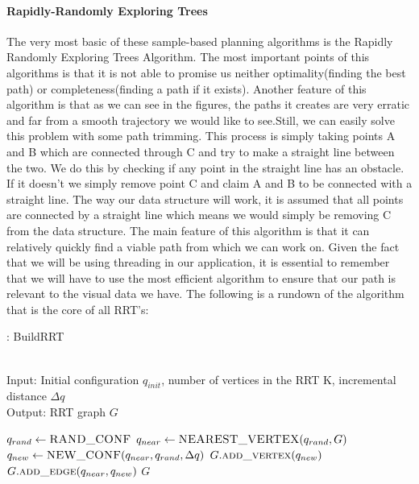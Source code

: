 \documentclass[titlepage]{article}
\begin{document}
\paragraph{Rapidly-Randomly Exploring Trees}
The very most basic of these sample-based planning algorithms is the Rapidly Randomly Exploring Trees Algorithm. The most important points of this algorithms is that it is not able to promise us neither optimality(finding the best path) or completeness(finding a path if it exists). Another feature of this algorithm is that as we can see in the figures, the paths it creates are very erratic and far from a smooth trajectory we would like to see.Still, we can easily solve this problem with some path trimming. This process is simply taking points A and B which are connected through C and try to make a straight line between the two. We do this by checking if any point in the straight line has an obstacle. If it doesn't we simply remove point C and claim A and B to be connected with a straight line. The way our data structure will work, it is assumed that all points are connected by a straight line which means we would simply be removing C from the data structure.
The main feature of this algorithm is that it can relatively quickly find a viable path from which we can work on. Given the fact that we will be using threading in our application, it is essential to remember that we will have to use the most efficient algorithm to ensure that our path is relevant to the visual data we have.
The following is a rundown of the algorithm that is the core of all RRT's:
\begin{algorithm}
\caption{: BuildRRT}\\
Input: Initial configuration $q_{init}$, number of vertices in the RRT K, incremental distance $\Delta q$\\
Output: RRT graph $G$
\begin{algorithmic}[1]
\State $q_{rand} \gets \Call{RAND\_CONF}{}$
\State $q_{near} \gets \Call{NEAREST\_VERTEX}{q_{rand}, G}$
\State $q_{new} \gets \Call{NEW\_CONF}{q_{near}, q_{rand}, \Delta q}$
\State $G.\Call{add\_vertex}{q_{new}}$
\State$G.\Call{add\_edge}{q_{near}, q_{new}}$
\EndFor
\State \Return $G$
\EndFunction
\end{algorithmic}
\end{algorithm}
\end{document}
